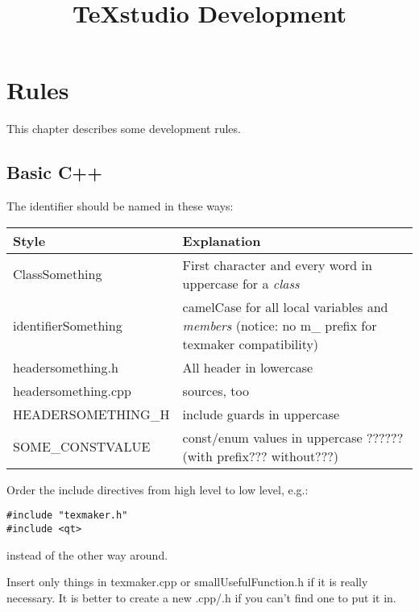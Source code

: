 \documentclass[10pt,a4paper,portrait]{article}
\begin{document}
\title{\vspace{-2ex}TeXstudio Development\vspace{-2ex}}
\date{}
\maketitle
	
\section{Rules}
This chapter describes some development rules.

\subsection{Basic C++}
The identifier should be named in these ways:

\begin{tabularx}{\textwidth}{lX}
	\textbf{Style}      & \textbf{Explanation}                                                                                    \\
\hline
	ClassSomething      & First character and every word in uppercase for a \emph{class}                                          \\
	identifierSomething & camelCase for all local variables and \emph{members} (notice: no m\_ prefix for texmaker compatibility) \\
	headersomething.h   & All header in lowercase                                                                                 \\
	headersomething.cpp & sources, too                                                                                            \\
	HEADERSOMETHING\_H  & include guards in uppercase                                                                             \\
	SOME\_CONSTVALUE    & const/enum values in uppercase ?????? (with prefix??? without???)                                       \\
\end{tabularx}

Order the include directives from high level to low level, e.g.:
\begin{verbatim}
#include "texmaker.h"
#include <qt>
\end{verbatim}
instead of the other way around.

Insert only things in texmaker.cpp or smallUsefulFunction.h if it is really necessary. It is better to create a new .cpp/.h if you can't find one to put it in.
\end{document}
